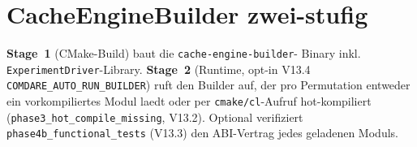 \section{CacheEngineBuilder zwei-stufig}

\textbf{Stage~1} (CMake-Build) baut die \texttt{cache-engine-builder}-
Binary inkl. \texttt{ExperimentDriver}-Library.
\textbf{Stage~2} (Runtime, opt-in V13.4 \texttt{COMDARE\_AUTO\_RUN\_BUILDER})
ruft den Builder auf, der pro Permutation entweder ein vorkompiliertes
Modul laedt oder per \texttt{cmake/cl}-Aufruf hot-kompiliert
(\texttt{phase3\_hot\_compile\_missing}, V13.2). Optional verifiziert
\texttt{phase4b\_functional\_tests} (V13.3) den ABI-Vertrag jedes
geladenen Moduls.
